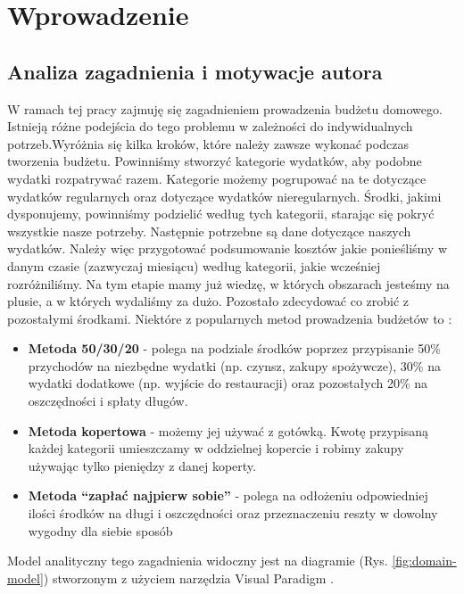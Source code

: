 \documentclass[shortabstract,inz]{iithesis}
\author         {Mateusz Kmita}
\begin{document}

\chapter{Wprowadzenie}
\section{Analiza zagadnienia i motywacje autora}
W ramach tej pracy zajmuję się zagadnieniem prowadzenia budżetu domowego. Istnieją różne podejścia do tego problemu \citep{budgeting-methods} w zależności do indywidualnych potrzeb.Wyróżnia się kilka kroków, które należy zawsze wykonać podczas tworzenia budżetu. Powinniśmy stworzyć kategorie wydatków, aby podobne wydatki rozpatrywać razem. Kategorie możemy pogrupować na te dotyczące wydatków regularnych oraz dotyczące wydatków nieregularnych. Środki, jakimi dysponujemy, powinniśmy podzielić według tych kategorii, starając się pokryć wszystkie nasze potrzeby.   Następnie potrzebne są dane dotyczące naszych wydatków. Należy więc przygotować podsumowanie kosztów jakie ponieśliśmy w danym czasie (zazwyczaj miesiącu) według kategorii, jakie wcześniej rozróżniliśmy. Na tym etapie mamy już wiedzę, w których obszarach jesteśmy na plusie, a w których wydaliśmy za dużo. Pozostało zdecydować co zrobić z pozostałymi środkami.
Niektóre z popularnych metod prowadzenia budżetów to \citep{budgeting-examples}:
\begin{itemize}
	\item \textbf{Metoda 50/30/20} - polega na podziale środków poprzez przypisanie 50\% przychodów na niezbędne wydatki (np. czynsz, zakupy spożywcze), 30\% na wydatki dodatkowe (np. wyjście do restauracji) oraz pozostałych 20\% na oszczędności i spłaty długów.
	\item \textbf{Metoda kopertowa} - możemy jej używać z gotówką. Kwotę przypisaną każdej kategorii umieszczamy w oddzielnej kopercie i robimy zakupy używając tylko pieniędzy z danej koperty. 
	\item \textbf{Metoda ``zapłać najpierw sobie''} - polega na odłożeniu odpowiedniej ilości środków na długi i oszczędności oraz przeznaczeniu reszty w dowolny wygodny dla siebie sposób
\end{itemize}
Model analityczny tego zagadnienia widoczny jest na diagramie (Rys. \ref{fig:domain-model}) stworzonym z użyciem narzędzia Visual Paradigm \citep{visual-paradigm}.
\end{document}
